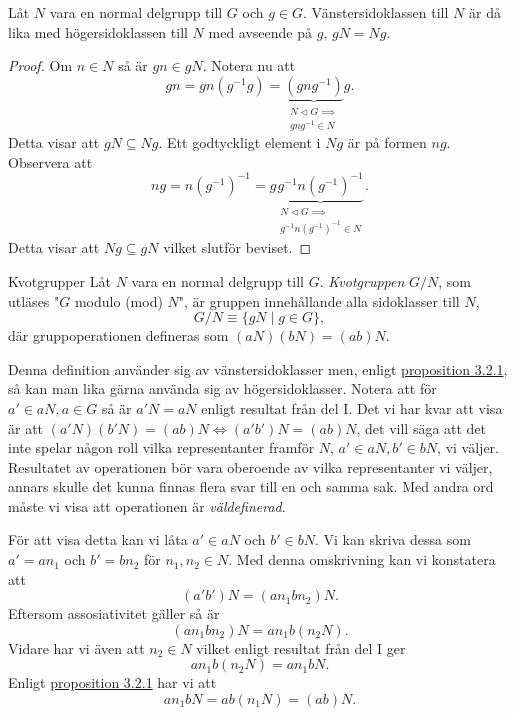 \documentclass{article}
\theoremstyle{definition}
\begin{document}
\hypertarget{prop1}{}
\begin{myprop}{}{}
  Låt $N$ vara en normal delgrupp till $G$ och $g \in G$. Vänstersidoklassen till $N$ är då lika med högersidoklassen till $N$ med avseende på $g$, 
  $gN = Ng.$
\end{myprop}
\begin{proof}
  Om $n \in N$ så är $gn \in gN$. Notera nu att 
  \begin{equation*}
    gn = gn(g^{-1}g) = \underbrace{(gng^{-1})}_{ \substack{N \triangleleft G  \implies \\ gng^{-1} \in N}} g.
  \end{equation*}
  Detta visar att $gN \subseteq Ng.$ Ett godtyckligt element i $Ng$ är på formen $ng$. Observera att 
  \begin{equation*}
    ng = n(g^{-1})^{-1} = g \underbrace{g^{-1} {n(g^{-1})^{-1}}}_{\substack{N \triangleleft G  \implies \\ g^{-1} {n(g^{-1})^{-1} \in N}}}.
  \end{equation*}
  Detta visar att $Ng \subseteq gN$ vilket slutför beviset.
\end{proof}

\begin{mydef}{Kvotgrupper}{}
  Låt $N$ vara en normal delgrupp till $G$. \textit{Kvotgruppen} $G/N$, som utläses "$G$ modulo (mod) $N$", är gruppen innehållande alla 
  sidoklasser till $N$, 
  \[G/N \equiv \{gN \; | \; g \in G\},\]
  där gruppoperationen defineras som $(aN) (bN) = (ab)N$. 
\end{mydef}
Denna definition använder sig av vänstersidoklasser men, enligt \hyperlink{prop1}{proposition 3.2.1}, så kan man lika gärna använda sig 
av högersidoklasser. Notera att för $a' \in aN, a \in G$ så är $a'N = aN$ enligt resultat från del I. Det vi har kvar att visa är att $(a'N) (b'N) = (ab)N
\iff (a'b')N = (ab)N$, det vill säga att det inte spelar någon roll vilka representanter framför $N$, $a' \in aN, b' \in bN$, vi väljer. Resultatet av 
operationen bör vara oberoende av vilka representanter vi väljer, annars skulle det kunna finnas flera svar till en och samma sak. Med 
andra ord måste vi visa att operationen är \textit{väldefinerad}.

För att visa detta kan vi låta $a' \in aN$ och $b' \in bN$. Vi kan skriva dessa som $a' = an_1$ och $b' = bn_2$ för $n_1, n_2 \in N$. Med denna 
omskrivning kan vi konstatera att
\[(a'b')N = (an_1bn_2)N.\]
Eftersom assosiativitet gäller så är 
\[(an_1bn_2)N = an_1b(n_2N).\]
Vidare har vi även att $n_2 \in N$ vilket enligt resultat från del I ger 
\[an_1b(n_2N) = an_1bN.\]
Enligt \hyperlink{prop1}{proposition 3.2.1} har vi att 
\[an_1bN = ab(n_1N) = (ab)N.\]
\end{document}
